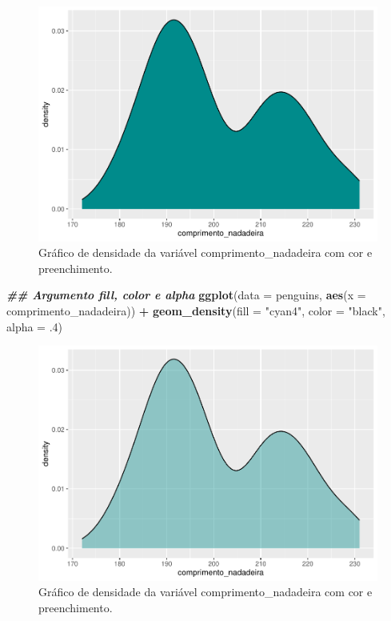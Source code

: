 \documentclass[
]{article}
\newenvironment{Shaded}{\begin{snugshade}}{\end{snugshade}}
\newcommand{\AttributeTok}[1]{\textcolor[rgb]{0.13,0.29,0.53}{#1}}
\newcommand{\DecValTok}[1]{\textcolor[rgb]{0.00,0.00,0.81}{#1}}
\newcommand{\DocumentationTok}[1]{\textcolor[rgb]{0.56,0.35,0.01}{\textbf{\textit{#1}}}}
\newcommand{\FunctionTok}[1]{\textcolor[rgb]{0.13,0.29,0.53}{\textbf{#1}}}
\newcommand{\NormalTok}[1]{#1}
\newcommand{\SpecialCharTok}[1]{\textcolor[rgb]{0.81,0.36,0.00}{\textbf{#1}}}
\newcommand{\StringTok}[1]{\textcolor[rgb]{0.31,0.60,0.02}{#1}}
\begin{document}
\begin{figure}
\includegraphics[width=0.75\linewidth,height=0.75\textheight]{epr_files/figure-latex/fig-dens-flipper-color-1} \caption{Gráfico de densidade da variável comprimento_nadadeira com cor e preenchimento.}\label{fig:fig-dens-flipper-color-1}
\end{figure}

\begin{Shaded}
\begin{Highlighting}[]
\DocumentationTok{\#\# Argumento fill, color e alpha}
\FunctionTok{ggplot}\NormalTok{(}\AttributeTok{data =}\NormalTok{ penguins, }\FunctionTok{aes}\NormalTok{(}\AttributeTok{x =}\NormalTok{ comprimento\_nadadeira)) }\SpecialCharTok{+}
    \FunctionTok{geom\_density}\NormalTok{(}\AttributeTok{fill =} \StringTok{"cyan4"}\NormalTok{, }\AttributeTok{color =} \StringTok{"black"}\NormalTok{, }\AttributeTok{alpha =}\NormalTok{ .}\DecValTok{4}\NormalTok{)}
\end{Highlighting}
\end{Shaded}

\begin{figure}
\includegraphics[width=0.75\linewidth,height=0.75\textheight]{epr_files/figure-latex/fig-dens-flipper-color-2} \caption{Gráfico de densidade da variável comprimento_nadadeira com cor e preenchimento.}\label{fig:fig-dens-flipper-color-2}
\end{figure}
\end{document}
